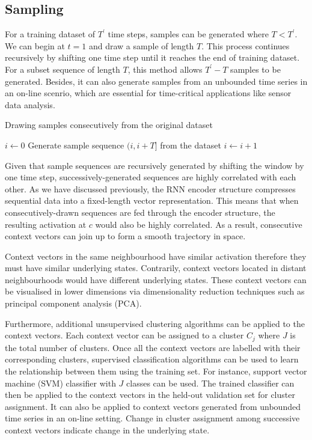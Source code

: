 \documentclass[runningheads]{llncs}
\begin{document}
\subsection{Sampling}

For a training dataset of \(T^\prime\) time steps, samples can be generated where \(T < T^\prime\). We can begin at \(t=1\) and draw a sample of length \(T\). This process continues recursively by shifting one time step until it reaches the end of training dataset. For a subset sequence of length \(T\), this method allows \(T^\prime - T\) samples to be generated. Besides, it can also generate samples from an unbounded time series in an on-line scenrio, which are essential for time-critical applications like sensor data analysis.

\begin{algorithm}[H]
	\label{consecutive_sampling}
	\caption{Drawing samples consecutively from the original dataset}
	\(i\leftarrow 0\) \;
	 {
		Generate sample sequence \((i, i+T]\) from the dataset\;
		\(i\leftarrow i+1\)\;
	}
\end{algorithm}

Given that sample sequences are recursively generated by shifting the window by one time step, successively-generated sequences are highly correlated with each other. As we have discussed previously, the RNN encoder structure compresses sequential data into a fixed-length vector representation. This means that when consecutively-drawn sequences are fed through the encoder structure, the resulting activation at \(c\) would also be highly correlated. As a result, consecutive context vectors can join up to form a smooth trajectory in space.

Context vectors in the same neighbourhood have similar activation therefore they must have similar underlying states. Contrarily, context vectors located in distant neighbourhoods would have different underlying states. These context vectors can be visualised in lower dimensions via dimensionality reduction techniques such as principal component analysis (PCA). 

Furthermore, additional unsupervised clustering algorithms can be applied to the context vectors. Each context vector can be assigned to a cluster \(C_j\) where \(J\) is the total number of clusters. Once all the context vectors are labelled with their corresponding clusters, supervised classification algorithms can be used to learn the relationship between them using the training set. For instance, support vector machine (SVM) classifier with \(J\) classes can be used. The trained classifier can then be applied to the context vectors in the held-out validation set for cluster assignment. It can also be applied to context vectors generated from unbounded time series in an on-line setting. Change in cluster assignment among successive context vectors indicate change in the underlying state.
\end{document}
